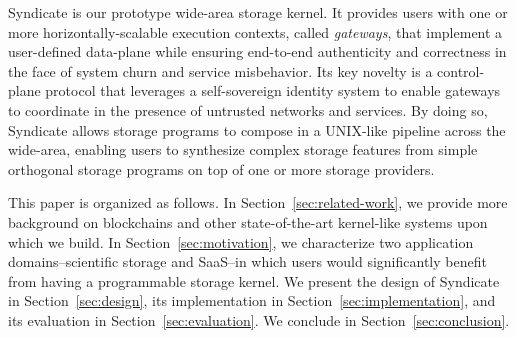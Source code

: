 Syndicate is our prototype wide-area storage kernel.  It provides 
users with one or more horizontally-scalable execution contexts, called
\textit{gateways}, that implement a user-defined data-plane while ensuring
end-to-end authenticity and correctness in the face of system churn and service
misbehavior.  Its key novelty is a control-plane protocol
that leverages a self-sovereign identity system to enable gateways to coordinate in
the presence of untrusted networks and services.  By doing so, Syndicate allows
storage programs to compose in a UNIX-like pipeline across the wide-area,
enabling users to synthesize complex storage features from simple
orthogonal storage programs on top of one or more storage providers.

This paper is organized as follows.  In Section~\ref{sec:related-work}, we
provide more background on blockchains and other state-of-the-art kernel-like systems upon
which we build.  In Section~\ref{sec:motivation}, we characterize two
application domains--scientific storage and SaaS--in which users would
significantly benefit from having a programmable storage kernel.  We present the
design of Syndicate in Section~\ref{sec:design}, its implementation in
Section~\ref{sec:implementation}, and its evaluation in
Section~\ref{sec:evaluation}.  We conclude in Section~\ref{sec:conclusion}.
